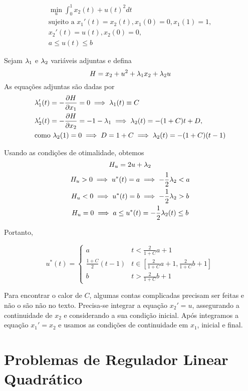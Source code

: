 \begin{example}
    \begin{gather*}
        \min_u \int_0^1 x_2(t) + u(t)^2 dt \\
        \text{sujeito a  }x_1'(t) = x_2(t), x_1(0) = 0, x_1(1) = 1, \\
        x_2 '(t) = u(t), x_2(0) = 0, \\
        a \le u(t) \le b
    \end{gather*}
\end{example}

Sejam $\lambda_1$ e $\lambda_2$ variáveis adjuntas e defina 
$$
H = x_2 + u^2 + \lambda_1x_2 + \lambda_2 u
$$
As equações adjuntas são dadas por 
\begin{align*}
    &\lambda_1 '(t) = -\frac{\partial H}{\partial x_1} = 0 \implies \lambda_1(t) \equiv C \\
    &\lambda_2 '(t) = -\frac{\partial H}{\partial x_2} = - 1 - \lambda_1 \implies \lambda_2(t) = -(1 + C)t + D,  \\ 
    &\text{como } \lambda_2(1) = 0 \implies D = 1 + C \implies \lambda_2(t) = -(1 + C)(t-1)
\end{align*}

Usando as condições de otimalidade, obtemos 
$$
H_u = 2u + \lambda_2 
$$
\begin{gather*}
    H_u > 0 \implies u^*(t) = a \implies -\frac{1}{2}\lambda_2 < a \\
    H_u < 0 \implies u^*(t) = b \implies -\frac{1}{2}\lambda_2 > b \\
    H_u = 0  \implies a \le u^*(t) =  -\frac{1}{2}\lambda_2(t) \le b 
\end{gather*}

Portanto, 

$$
u^*(t) = \begin{cases}
    a &t < \frac{2}{1 + C} a + 1 \\
    \frac{1 + C}{2}(t-1) &t \in \left[\frac{2}{1 + C} a + 1, \frac{2}{1 + C}b + 1\right] \\
    b &t > \frac{2}{1 + C}b + 1
\end{cases}
$$

Para encontrar o calor de $C$, algumas contas complicadas precisam ser feitas
e não o são não no texto. Precisa-se integrar a equação $x_2 ' = u$,
assegurando a continuidade de $x_2$ e considerando a sua condição inicial.
Após integramos a equação $x_1 ' = x_2$ e usamos as condições de continuidade
em $x_1$, inicial e final. 


\section{Problemas de Regulador Linear Quadrático}

